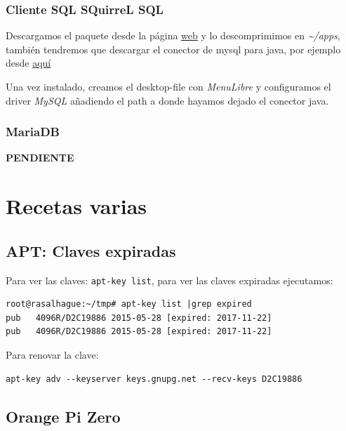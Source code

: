 \documentclass[12pt,spanish,]{scrartcl}
\begin{document}
\hypertarget{cliente-sql-squirrel-sql}{%
\subsubsection{Cliente SQL SQuirreL
SQL}\label{cliente-sql-squirrel-sql}}

Descargamos el paquete desde la página
\href{http://squirrel-sql.sourceforge.net/}{web} y lo descomprimimos en
\emph{\textasciitilde{}/apps}, también tendremos que descargar el
conector de mysql para java, por ejemplo desde
\href{http://dev.mysql.com/downloads/connector/j/3.0.html}{aquí}

Una vez instalado, creamos el desktop-file con \emph{MenuLibre} y
configuramos el driver \emph{MySQL} añadiendo el path a donde hayamos
dejado el conector java.

\hypertarget{mariadb}{%
\subsubsection{MariaDB}\label{mariadb}}

\textbf{PENDIENTE}

\hypertarget{recetas-varias}{%
\section{Recetas varias}\label{recetas-varias}}

\hypertarget{apt-claves-expiradas}{%
\subsection{APT: Claves expiradas}\label{apt-claves-expiradas}}

Para ver las claves: \texttt{apt-key\ list}, para ver las claves
expiradas ejecutamos:

\begin{verbatim}
root@rasalhague:~/tmp# apt-key list |grep expired
pub   4096R/D2C19886 2015-05-28 [expired: 2017-11-22]
pub   4096R/D2C19886 2015-05-28 [expired: 2017-11-22]
\end{verbatim}

Para renovar la clave:

\begin{verbatim}
apt-key adv --keyserver keys.gnupg.net --recv-keys D2C19886
\end{verbatim}

\hypertarget{orange-pi-zero}{%
\subsection{Orange Pi Zero}\label{orange-pi-zero}}
\end{document}
